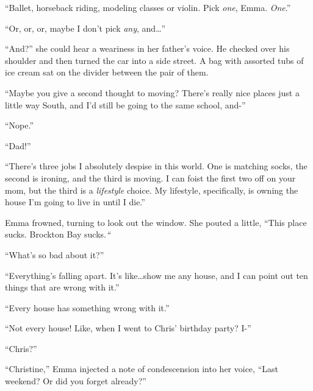 





``Ballet, horseback riding, modeling classes or violin.  Pick \emph{one}, Emma.  \emph{One}.''



``Or, or, or, maybe I don't pick \emph{any}, and\ldots''



``And?'' she could hear a weariness in her father's voice.  He checked over his shoulder and then turned the car into a side street.  A bag with assorted tubs of ice cream sat on the divider between the pair of them.



``Maybe you give a second thought to moving?   There's really nice places just a little way South, and I'd still be going to the same school, and-''



``Nope.''



``Dad!''



``There's three jobs I absolutely despise in this world.  One is matching socks, the second is ironing, and the third is moving.  I can foist the first two off on your mom, but the third is a \emph{lifestyle} choice.  My lifestyle, specifically, is owning the house I'm going to live in until I die.''



Emma frowned, turning to look out the window.  She pouted a little, ``This place sucks.  Brockton Bay sucks.\emph{``}



``What's so bad about it?''



``Everything's falling apart.  It's like\ldots show me any house, and I can point out ten things that are wrong with it.''



``Every house has something wrong with it.''



``Not every house!  Like, when I went to Chris' birthday party?  I-''



``Chris?''



``Christine,'' Emma injected a note of condescension into her voice, ``Last weekend?  Or did you forget already?''



